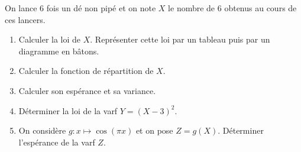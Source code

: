 \documentclass[a4paper, 11pt,reqno]{article}
\begin{document}
\begin{exercice}  \;
	On lance 6 fois un d\'e non pip\'e et on note $X$ le nombre de 6 obtenus au cours de ces lancers.
	\begin{enumerate}
		\item Calculer la loi de $X$. Repr\'esenter cette loi par un tableau puis par un diagramme en b\^atons.
		\item Calculer la fonction de r\'epartition de $X$.
		\item Calculer son esp\'erance et sa variance.
		\item D\'eterminer la loi de la varf $Y=(X-3)^2$.
		\item On consid\`ere $g: x\mapsto \cos{(\pi x)}$ et on pose $Z=g(X)$. D\'eterminer l'esp\'erance de la varf $Z$.
	\end{enumerate}
\end{exercice}
\end{document}
